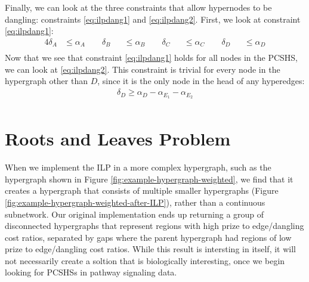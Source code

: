 \documentclass[12pt,twoside]{reedthesis}
\theoremstyle{definition}
\begin{document}
Finally, we can look at the three constraints that allow hypernodes to be dangling: constraints \eqref{eq:ilpdang1} and \eqref{eq:ilpdang2}. First, we look at constraint \eqref{eq:ilpdang1}:
\begin{alignat*}{4}
  \delta_A &\leq \alpha_A \qquad \delta_B &&\leq \alpha_B \qquad \delta_C &&\leq \alpha_C \qquad \delta_D &&\leq \alpha_D\\
\end{alignat*}%
Now that we see that constraint \eqref{eq:ilpdang1} holds for all nodes in the PCSHS, we can look at \ref{eq:ilpdang2}. This constraint is trivial for every node in the hypergraph other than $D$, since it is the only node in the head of any hyperedges:
\begin{align*}
 \delta_D \geq \alpha_{D} - \alpha_{E_1} - \alpha_{E_2}\\
\end{align*}%


\section{Roots and Leaves Problem}

When we implement the ILP in a more complex hypergraph, such as the hypergraph shown in Figure \ref{fig:example-hypergraph-weighted}, we find that it creates a hypergraph that consists of multiple smaller hypergraphs (Figure \ref{fig:example-hypergraph-weighted-after-ILP}), rather than a continuous subnetwork. Our original implementation ends up returning a group of disconnected hypergraphs that represent regions with high prize to edge/dangling cost ratios, separated by gaps where the parent hypergraph had regions of low prize to edge/dangling cost ratios. While this result is intersting in itself, it will not necessarily create a soltion that is biologically interesting, once we begin looking for PCSHSs in pathway signaling data.\par
\end{document}
